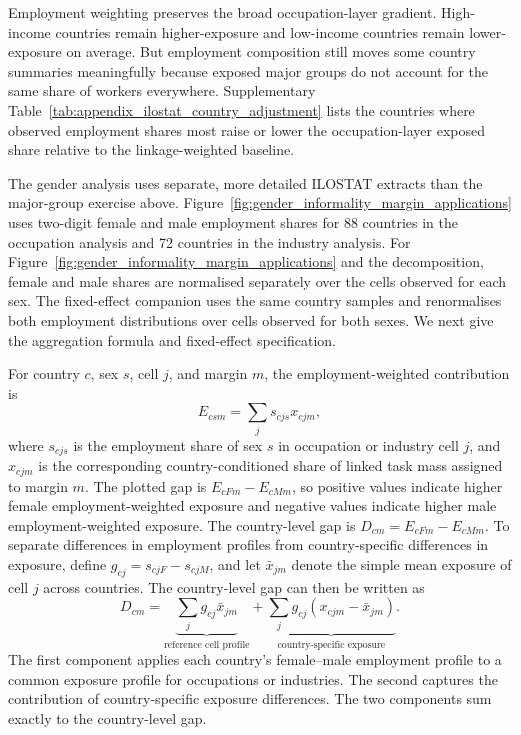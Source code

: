 \documentclass[11pt]{article}
\begin{document}
Employment weighting preserves the broad occupation-layer gradient. High-income countries remain higher-exposure and low-income countries remain lower-exposure on average. But employment composition still moves some country summaries meaningfully because exposed major groups do not account for the same share of workers everywhere. Supplementary Table~\ref{tab:appendix_ilostat_country_adjustment} lists the countries where observed employment shares most raise or lower the occupation-layer exposed share relative to the linkage-weighted baseline.



The gender analysis uses separate, more detailed ILOSTAT extracts than the major-group exercise above. Figure~\ref{fig:gender_informality_margin_applications} uses two-digit female and male employment shares for 88 countries in the occupation analysis and 72 countries in the industry analysis. For Figure~\ref{fig:gender_informality_margin_applications} and the decomposition, female and male shares are normalised separately over the cells observed for each sex. The fixed-effect companion uses the same country samples and renormalises both employment distributions over cells observed for both sexes. We next give the aggregation formula and fixed-effect specification.

For country $c$, sex $s$, cell $j$, and margin $m$, the employment-weighted contribution is
\[
E_{csm}=\sum_j s_{cjs}x_{cjm},
\]
where $s_{cjs}$ is the employment share of sex $s$ in occupation or industry cell $j$, and $x_{cjm}$ is the corresponding country-conditioned share of linked task mass assigned to margin $m$. The plotted gap is $E_{cFm}-E_{cMm}$, so positive values indicate higher female employment-weighted exposure and negative values indicate higher male employment-weighted exposure.
The country-level gap is \(D_{cm}=E_{cFm}-E_{cMm}\). To separate differences in employment profiles from country-specific differences in exposure, define \(g_{cj}=s_{cjF}-s_{cjM}\), and let \(\bar{x}_{jm}\) denote the simple mean exposure of cell \(j\) across countries. The country-level gap can then be written as
\[
D_{cm}
=
\underbrace{\sum_j g_{cj}\bar{x}_{jm}}_{\text{reference cell profile}}
+
\underbrace{\sum_j g_{cj}(x_{cjm}-\bar{x}_{jm})}_{\text{country-specific exposure}}.
\]
The first component applies each country's female--male employment profile to a common exposure profile for occupations or industries. The second captures the contribution of country-specific exposure differences. The two components sum exactly to the country-level gap.
\end{document}
